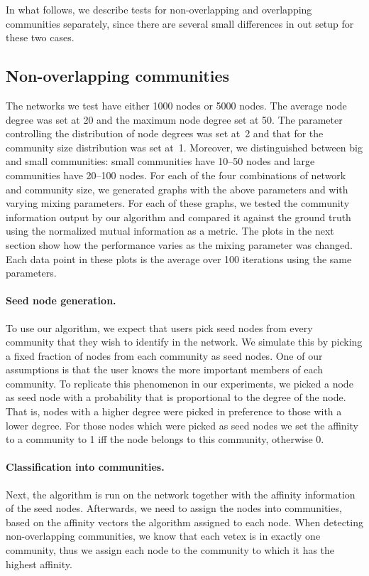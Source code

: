 In what follows, we describe tests for non-overlapping and overlapping communities separately, since 
there are several small differences in out setup for these two cases. 

\subsection{Non-overlapping communities}
The networks we test have either 1000 nodes or 5000 nodes. The average node degree
was set at 20 and the maximum node degree set at 50. The parameter controlling the 
distribution of node degrees was set at~2 and that for the community size distribution was 
set at~1. Moreover, we distinguished between big and small communities: small communities have 
10--50 nodes and large communities have 20--100 nodes. 
For each of the four combinations of network and community size, we generated graphs with the 
above parameters and with varying mixing parameters. For each of these graphs, we tested the 
community information output by our algorithm and compared it against the ground truth 
using the normalized mutual information as a metric. The plots in the next section 
show how the performance varies as the mixing parameter was changed. Each data point in 
these plots is the average over 100 iterations using the same parameters. 

\paragraph{Seed node generation.} 
To use our algorithm, we expect that users pick seed nodes from 
every community that they wish to identify in the network. 
We simulate this by picking a fixed fraction of nodes from each community as seed nodes.
One of our assumptions is that the user knows the more important members of each community. 
To replicate this phenomenon in our experiments, we picked a node as seed node
with a probability that is proportional to the degree of the node.
That is, nodes with a higher degree were picked in preference to those with a lower degree.
For those nodes which were picked as seed nodes we set the affinity to a community to 1 iff
the node belongs to this community, otherwise 0.

\paragraph{Classification into communities.}
Next, the algorithm is run on the network together with the affinity information of the seed nodes.
Afterwards, we need to assign the nodes into communities, 
based on the affinity vectors the algorithm assigned to each node.
When detecting non-overlapping communities, we know that each vetex is in exactly one community,
thus we assign each node to the community to which it has the highest affinity.

